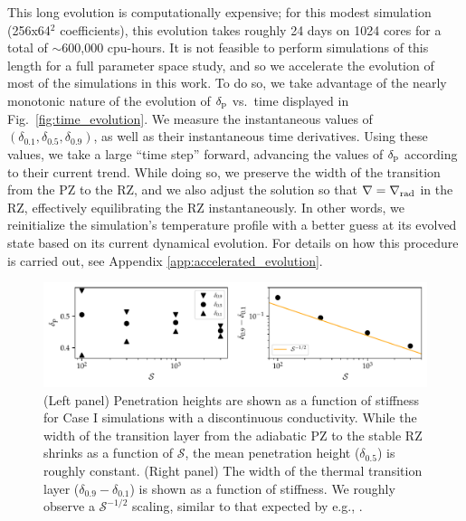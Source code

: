 \documentclass[twocolumn]{aastex631}
\newcommand{\gradrad}{\ensuremath{\nabla_{\rm{rad}}}}
\newcommand{\justgrad}{\ensuremath{\nabla}}
\newcommand{\delp}{\ensuremath{\delta_{\rm{p}}}}
\newcommand{\mS}{\ensuremath{\mathcal{S}}}
\begin{document}
This long evolution is computationally expensive; for this modest simulation (256x64$^2$ coefficients), this evolution takes roughly 24 days on 1024 cores for a total of $\sim$600,000 cpu-hours.
It is not feasible to perform simulations of this length for a full parameter space study, and so we accelerate the evolution of most of the simulations in this work.
To do so, we take advantage of the nearly monotonic nature of the evolution of $\delp$ vs.~time displayed in Fig.~\ref{fig:time_evolution}.
We measure the instantaneous values of $(\delta_{0.1}, \delta_{0.5}, \delta_{0.9})$, as well as their instantaneous time derivatives.
Using these values, we take a large ``time step'' forward, advancing the values of $\delp$ according to their current trend.
While doing so, we preserve the width of the transition from the PZ to the RZ, and we also adjust the solution so that $\justgrad = \gradrad$ in the RZ, effectively equilibrating the RZ instantaneously.
In other words, we reinitialize the simulation's temperature profile with a better guess at its evolved state based on its current dynamical evolution.
For details on how this procedure is carried out, see Appendix \ref{app:accelerated_evolution}.

\begin{figure}[t]
\centering
\includegraphics{parameters_vs_s.pdf}
\caption{
(Left panel) Penetration heights are shown as a function of stiffness for Case I simulations with a discontinuous conductivity.
While the width of the transition layer from the adiabatic PZ to the stable RZ shrinks as a function of $\mS$, the mean penetration height ($\delta_{0.5}$) is roughly constant.
(Right panel) The width of the thermal transition layer ($\delta_{0.9} - \delta_{0.1}$) is shown as a function of stiffness.
We roughly observe a $\mS^{-1/2}$ scaling, similar to that expected by e.g., \citet{korre_etal_2019}.
\label{fig:parameters_vs_s}
}
\end{figure}
\end{document}
